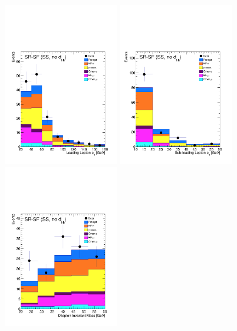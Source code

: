\begin{figure}[!htb]
    \begin{center}
    \includegraphics[width=0.45\textwidth]{figures/search_hh/bkg_estimate/fake/fake_val_sr_sf_ss_l0_pt}
    \includegraphics[width=0.45\textwidth]{figures/search_hh/bkg_estimate/fake/fake_val_sr_sf_ss_l1_pt}
    \includegraphics[width=0.45\textwidth]{figures/search_hh/bkg_estimate/fake/fake_val_sr_sf_ss_mll}

\end{center}
\end{figure}
